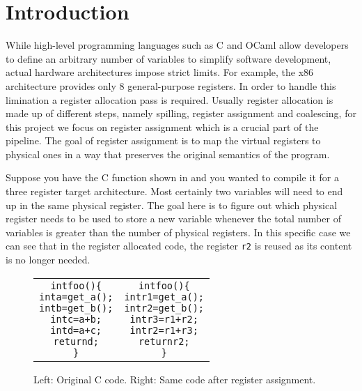 
\chapter{Introduction}
\label{cha:intro}

While high-level programming languages such as C and OCaml allow developers to define an arbitrary number of variables to simplify software development, actual hardware architectures impose strict limits. For example, the x86 architecture provides only 8 general-purpose registers.
In order to handle this limination a register allocation pass is required. Usually register allocation is made up of different steps, namely spilling, register assignment and coalescing, for this project we focus on register assignment which is a crucial part of the pipeline.
The goal of register assignment is to map the virtual registers to physical ones in a way that preserves the original semantics of the program.

Suppose you have the C function shown in  and you wanted to compile it for a three register target architecture. Most certainly two variables will need to end up in the same physical register. The goal here is to figure out which physical register needs to be used to store a new variable whenever the total number of variables is greater than the number of physical registers. In this specific case we can see that in the register allocated code, the register \texttt{r2} is reused as its content is no longer needed.

\begin{figure}[ht]
\centering
\begin{tabular}{@{}c@{\hspace{1.5em}}c@{}}
\begin{minipage}{0.45\linewidth}
\begin{alltt}
int foo() \{
    int a = get_a();
    int b = get_b();
    int c = a + b;
    int d = a + c;
    return d;
\}
\end{alltt}
\end{minipage}
&
\begin{minipage}{0.45\linewidth}
\begin{alltt}
int foo() \{
    int r1 = get_a();
    int r2 = get_b();
    int r3 = r1 + r2;
    int r2 = r1 + r3;
    return r2;
\}
\end{alltt}
\end{minipage}
\end{tabular}
\caption{Left: Original C code. Right: Same code after register assignment.}
\label{fig:cfun}
\end{figure}


